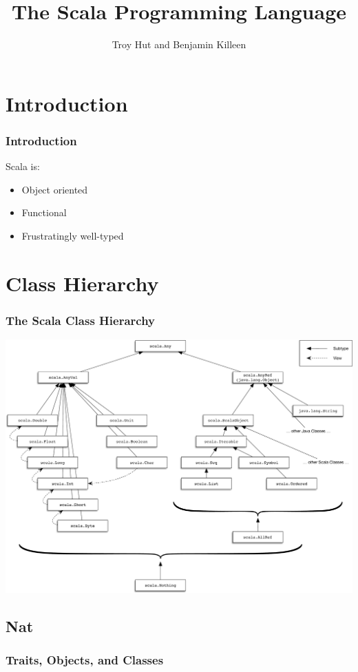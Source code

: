 \documentclass[10pt, usenames, dvipsnames, table]{beamer}
\title{The Scala Programming Language}
\author{Troy Hut and Benjamin Killeen}
\date{}
\begin{document}
\begin{frame}
  \titlepage{}
\end{frame}

\section{Introduction}
\begin{frame}
  \frametitle{Introduction}
  Scala is:
  \begin{itemize}
  \item<2-> Object oriented
  \item<3-> Functional
  \item<4-> Frustratingly well-typed
  \end{itemize}
\end{frame}

\section{Class Hierarchy}
\begin{frame}
  \frametitle{The Scala Class Hierarchy}
  \centering
  \includegraphics[width=0.9\linewidth]{scala_classes}
\end{frame}

\subsection{Nat}
\begin{frame}
  \frametitle{Traits, Objects, and Classes}
  \inputminted{Scala}{../examples/ExampleNat.scala}
  \pause{}
  \inputminted{Scala}{../examples/ExampleZero.scala}
  \pause{}
  \inputminted{Scala}{../examples/ExampleSucc.scala}  
\end{frame}
\end{document}
